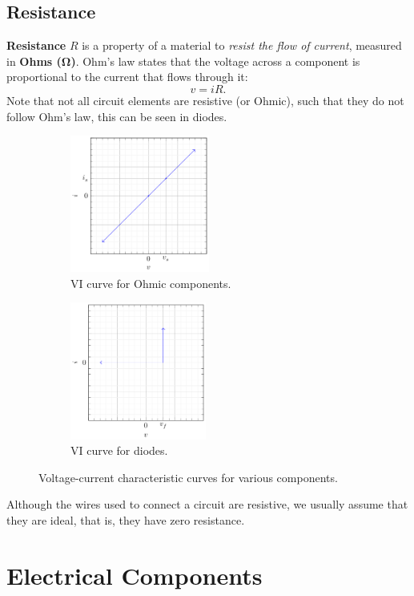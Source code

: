 \documentclass[a4paper]{report}
\begin{document}
\subsection{Resistance}
\textbf{Resistance} \(R\) is a property of a material to \textit{resist the flow of current}, measured in \textbf{Ohms (\unit{\ohm})}.
Ohm's law states that the voltage across a component is proportional to the current that flows through it:
\begin{equation*}
    v = i R.
\end{equation*}
Note that not all circuit elements are resistive (or Ohmic), such that they
do not follow Ohm's law, this can be seen in diodes.
\begin{figure}[H]
    \centering
    \begin{subfigure}{0.47\linewidth}
        \centering
        \includegraphics[height=4.5cm]{figures/vi_ohmic.pdf}
        \caption{VI curve for Ohmic components.}
    \end{subfigure}
    \begin{subfigure}{0.47\linewidth}
        \centering
        \includegraphics[height=4.5cm]{figures/vi_diode.pdf}
        \caption{VI curve for diodes.}
    \end{subfigure}
    \caption{Voltage-current characteristic curves for various components.}
\end{figure}
Although the wires used to connect a circuit are resistive, we usually assume that they are ideal, that is,
they have zero resistance.
\section{Electrical Components}
\end{document}
